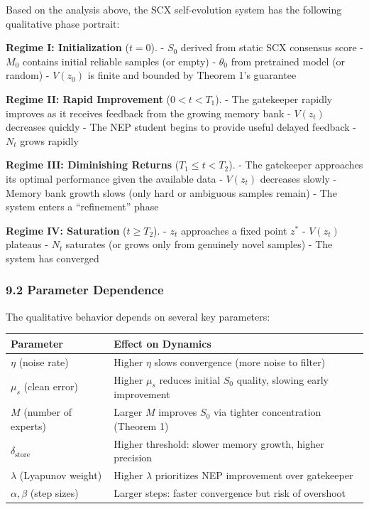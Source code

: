 \documentclass[
  12pt,
]{ctexart}
\begin{document}
Based on the analysis above, the SCX self-evolution system has the
following qualitative phase portrait:

\textbf{Regime I: Initialization} (\(t = 0\)). - \(S_0\) derived from
static SCX consensus score - \(M_0\) contains initial reliable samples
(or empty) - \(\theta_0\) from pretrained model (or random) - \(V(z_0)\)
is finite and bounded by Theorem 1's guarantee

\textbf{Regime II: Rapid Improvement} (\(0 < t < T_1\)). - The
gatekeeper rapidly improves as it receives feedback from the growing
memory bank - \(V(z_t)\) decreases quickly - The NEP student begins to
provide useful delayed feedback - \(N_t\) grows rapidly

\textbf{Regime III: Diminishing Returns} (\(T_1 \leq t < T_2\)). - The
gatekeeper approaches its optimal performance given the available data -
\(V(z_t)\) decreases slowly - Memory bank growth slows (only hard or
ambiguous samples remain) - The system enters a ``refinement'' phase

\textbf{Regime IV: Saturation} (\(t \geq T_2\)). - \(z_t\) approaches a
fixed point \(z^*\) - \(V(z_t)\) plateaus - \(N_t\) saturates (or grows
only from genuinely novel samples) - The system has converged

\subsubsection{9.2 Parameter Dependence}\label{parameter-dependence}

The qualitative behavior depends on several key parameters:

\begin{longtable}[]{@{}
  >{\raggedright\arraybackslash}p{}
  >{\raggedright\arraybackslash}p{}@{}}
\toprule\noalign{}
\begin{minipage}[b]{\linewidth}\raggedright
Parameter
\end{minipage} & \begin{minipage}[b]{\linewidth}\raggedright
Effect on Dynamics
\end{minipage} \\
\midrule\noalign{}
\endhead
\bottomrule\noalign{}
\endlastfoot
\(\eta\) (noise rate) & Higher \(\eta\) slows convergence (more noise to
filter) \\
\(\mu_s\) (clean error) & Higher \(\mu_s\) reduces initial \(S_0\)
quality, slowing early improvement \\
\(M\) (number of experts) & Larger \(M\) improves \(S_0\) via tighter
concentration (Theorem 1) \\
\(\delta_{\text{store}}\) & Higher threshold: slower memory growth,
higher precision \\
\(\lambda\) (Lyapunov weight) & Higher \(\lambda\) prioritizes NEP
improvement over gatekeeper \\
\(\alpha, \beta\) (step sizes) & Larger steps: faster convergence but
risk of overshoot \\
\end{longtable}
\end{document}
